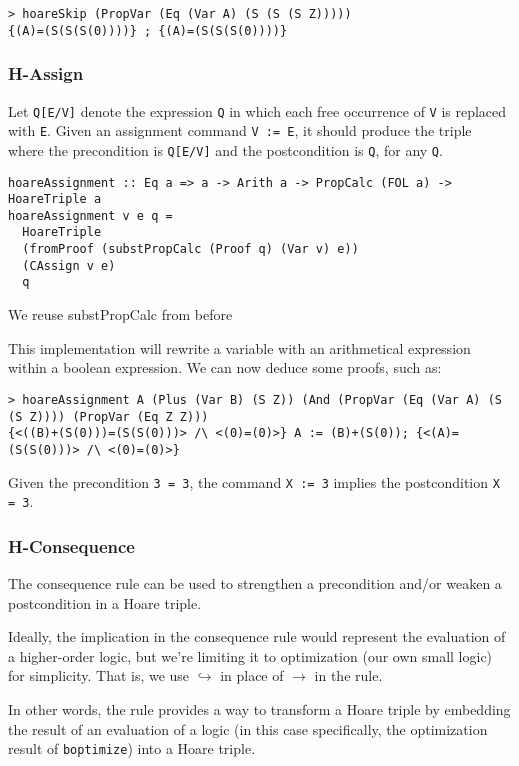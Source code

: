 \documentclass{article}
\begin{document}
\begin{lstlisting}
> hoareSkip (PropVar (Eq (Var A) (S (S (S Z)))))
{(A)=(S(S(S(0))))} ; {(A)=(S(S(S(0))))}
\end{lstlisting}

\subsubsection{H-Assign}

Let \texttt{Q[E/V]} denote the expression \texttt{Q} in which each free occurrence of \texttt{V} is replaced with \texttt{E}. Given an assignment command \texttt{V := E}, it should produce the triple where the precondition is \texttt{Q[E/V]} and the postcondition is \texttt{Q}, for any \texttt{Q}.

\begin{lstlisting}
hoareAssignment :: Eq a => a -> Arith a -> PropCalc (FOL a) -> HoareTriple a
hoareAssignment v e q =
  HoareTriple
  (fromProof (substPropCalc (Proof q) (Var v) e))
  (CAssign v e)
  q
\end{lstlisting}

We reuse substPropCalc from before

This implementation will rewrite a variable with an arithmetical expression within a boolean expression. We can now deduce some proofs, such as:

\begin{lstlisting}
> hoareAssignment A (Plus (Var B) (S Z)) (And (PropVar (Eq (Var A) (S (S Z)))) (PropVar (Eq Z Z)))
{<((B)+(S(0)))=(S(S(0)))> /\ <(0)=(0)>} A := (B)+(S(0)); {<(A)=(S(S(0)))> /\ <(0)=(0)>}
\end{lstlisting}

Given the precondition \texttt{3 = 3}, the command \texttt{X := 3} implies the postcondition \texttt{X = 3}.

\subsubsection{H-Consequence}

The consequence rule can be used to strengthen a precondition and/or weaken a postcondition in a Hoare triple.

Ideally, the implication in the consequence rule would represent the evaluation of a higher-order logic, but we're limiting it to optimization (our own small logic) for simplicity. That is, we use $\hookrightarrow$ in place of $\to$ in the rule.

In other words, the rule provides a way to transform a Hoare triple by embedding the result of an evaluation of a logic (in this case specifically, the optimization result of \texttt{boptimize}) into a Hoare triple.
\end{document}
